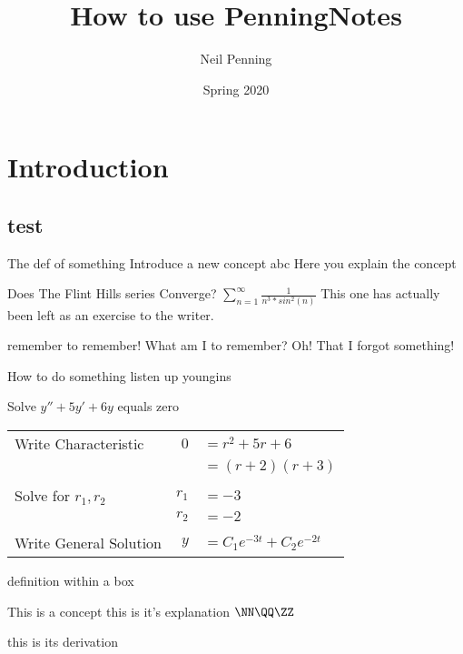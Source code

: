 \documentclass{article}
\title{How to use PenningNotes}
\author{Neil Penning}
\date{Spring 2020}
\begin{document}
\maketitle
\setcounter{tocdepth}{3}%
\tableofcontents
\section{Introduction}
\subsection{test}
\begin{boxDefinition}{The def of something}
Introduce a new concept abc
\tcblower
Here you explain the concept
\end{boxDefinition}

	


\begin{boxProblem}{Does The Flint Hills series Converge?}
$\sum_{n=1}^\infty\frac{1}{n^3 * sin^2(n)}$
\tcblower
This one has actually been left as an exercise to the writer.
\end{boxProblem}

\begin{boxNote}{remember to remember!}
What am I to remember? Oh! That I forgot something!
\end{boxNote}
\begin{boxMethod}[sidebyside=true]{How to do something}
    listen up youngins
\end{boxMethod}

\begin{boxGuidedProblem}{Solve $y''+5y'+6y$ equals zero}
        \begin{tabular}{l|rl}
            Write Characteristic & $0$ &$= r^2 + 5r + 6$ \\
            &&$=(r+2)(r+3)$\\
            \\
            Solve for $r_1,r_2$&$r_1$&$=-3$\\
            &$r_2$&$=-2$ \\
            \\
            Write General Solution&$y$ &$=C_1e^{-3t} + C_2e^{-2t}$\\
        \end{tabular}
    \end{boxGuidedProblem}

\begin{boxDerivation}{definition within a box}
\begin{boxDefinition}{}
This is a concept
\tcblower
this is it's explanation
$\NN \QQ \ZZ$
\end{boxDefinition}
\tcblower
this is its derivation
\end{boxDerivation}
\end{document}
